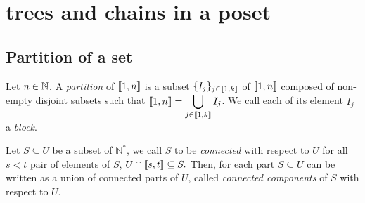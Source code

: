 \section{\Sch{} trees and chains in a poset}

\subsection{Partition of a set}

\begin{defi}
	Let $n\in\mathbb{N}$.
	A \emph{partition} of $\llbracket 1,n \rrbracket$ is a subset $\{I_j\}_{j\in \llbracket 1,k \rrbracket}$ of $\llbracket 1,n \rrbracket$ composed of non-empty disjoint subsets such that $\llbracket 1,n \rrbracket=\displaystyle\bigcup_{j\in\llbracket 1,k \rrbracket} I_j$.
	We call each of its element $I_j$ a \emph{block}.
\end{defi}

\begin{defi}\label{defi:connexe}
	Let $S\subseteq U$ be a subset of $\mathbb{N}^*$, we call $S$ to be \emph{connected} with respect to $U$ \ssi{} for all $s<t$ pair of elements of $S$, $U\cap \llbracket s,t \rrbracket\subseteq S.$ Then, for each part $S\subseteq U$ can be written as a union of connected parts of $U$, called \emph{connected components} of $S$ with respect to $U$.
\end{defi}

